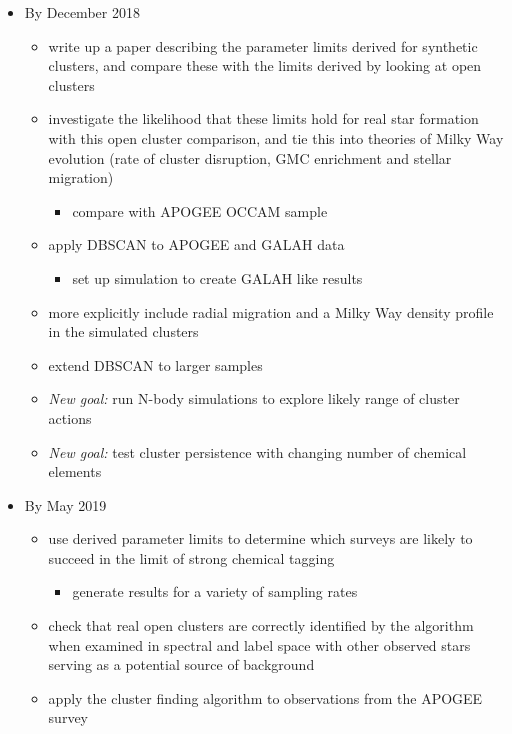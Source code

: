 \documentclass[11pt]{article}
\begin{document}
\begin{itemize}

\item By December 2018
\begin{itemize}
\item {\color{RoyalBlue} write up a paper describing the parameter limits derived for synthetic clusters, and compare these with the limits derived by looking at open clusters}
\item {\color{ForestGreen} investigate the likelihood that these limits hold for real star formation with this open cluster comparison, and tie this into theories of Milky Way evolution (rate of cluster disruption, GMC enrichment and stellar migration)}
\begin{itemize}
\item {\color{RoyalBlue} compare with APOGEE OCCAM sample}
\end{itemize}
\item {\color{RoyalBlue} apply DBSCAN to APOGEE and GALAH data}
\begin{itemize}
\item {\color{ForestGreen} set up simulation to create GALAH like results}
\end{itemize}
\item {\color{RoyalBlue} more explicitly include radial migration and a Milky Way density profile in the simulated clusters}
\item {\color{RoyalBlue} extend DBSCAN to larger samples}
\item \emph{New goal:} run N-body simulations to explore likely range of cluster actions
\item \emph{New goal:} test cluster persistence with changing number of chemical elements
\end{itemize}
\item By May 2019
\begin{itemize}
\item {\color{RoyalBlue} use derived parameter limits to determine which surveys are likely to succeed in the limit of strong chemical tagging}
	\begin{itemize}
		\item {\color{RoyalBlue} generate results for a variety of sampling rates}
	\end{itemize}
\item {\color{RoyalBlue} check that real open clusters are correctly identified by the algorithm when examined in spectral and label space with other observed stars serving as a potential source of background} 
\item {\color{RoyalBlue} apply the cluster finding algorithm to observations from the APOGEE survey}
\end{itemize}


\end{itemize}
\end{document}
